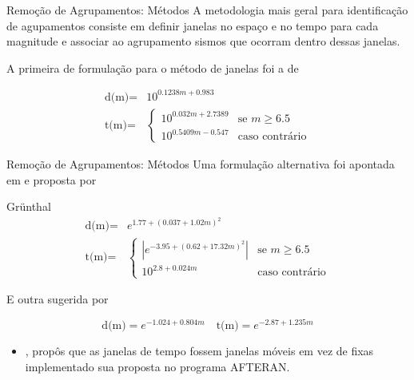 \documentclass[ucs,8pt]{beamer}
\begin{document}
\begin{frame}{Remoção de Agrupamentos: Métodos}
	A metodologia mais geral para identificação de agupamentos consiste em definir
	janelas no espaço e no tempo para cada magnitude e associar ao agrupamento
	sismos que ocorram dentro dessas janelas.
	\vspace{0.3cm}

	A primeira de formulação para o método de janelas foi a de 
	\begin{block}{\citet{gardner_1974}}
		\begin{equation}\begin{split} 
		\mbox{d(m)} = &10^{0.1238 m + 0.983}\\
		\mbox{t(m)} = & 
		\begin{cases} 10^{0.032 m + 2.7389} & \text{se $m \geq 6.5$} \\ 
		              10^{0.5409 m - 0.547} & \mbox{caso contrário}  \end{cases}\end{split}
		\end{equation}
	\end{block}

\end{frame}

\begin{frame}{Remoção de Agrupamentos: Métodos}
	Uma formulação alternativa foi apontada em \citep{marsan_david_2012} e proposta por
	\begin{block}{Gr\"unthal}
		\begin{equation}\begin{split} 
		\mbox{d(m)} = & e^{1.77 + \left( {0.037 + 1.02 m} \right)^2} \\ 
		   \mbox{t(m)} = & \begin{cases}   |e^{-3.95+ \left( {0.62 + 17.32 m}
		    \right)^2}|    & \text{se $m \geq 6.5$ } \\ 10^{2.8 + 0.024 m} & 
		    \text{caso contrário}  \end{cases}\end{split}
		\end{equation}
	\end{block}
	\vspace{0.3cm}
	E outra sugerida por 
	\begin{block}{\citet{uhrhammer_1986}}
		\begin{equation}
		\mbox{d(m)} = e^{-1.024 + 0.804 m} \quad \mbox{t(m)} = 
		    e^{-2.87 + 1.235 m}
		\end{equation}
	\end{block}
	\vspace{0.3cm}
	
	\begin{itemize}
		\item \citet{musson_1999}, propôs que as janelas de tempo
fossem janelas móveis em vez de fixas implementado sua proposta no programa AFTERAN.
	\end{itemize}
\end{frame}
\end{document}
